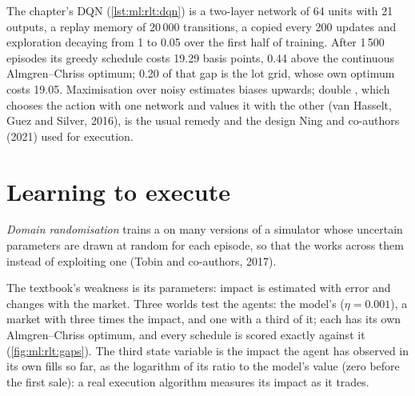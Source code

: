 The chapter's DQN (\cref{lst:ml:rlt:dqn}) is a two-layer network of 64 units with 21 outputs, a replay memory of 20\,000
transitions, a  copied every 200 updates and exploration decaying from 1 to 0.05 over the first half of
training. After 1\,500 episodes its greedy schedule costs 19.29 basis points, 0.44 above the continuous Almgren--Chriss
optimum; 0.20 of that gap is the lot grid, whose own optimum costs 19.05. Maximisation over noisy estimates biases 
upwards; double , which chooses the action with one network and values it with the other (van Hasselt, Guez and
Silver, 2016), is the usual remedy and the design Ning and co-authors (2021) used for execution.

\section{Learning to execute}

\begin{definition}\label{def:ml:reinforcement-learning-for-execution-and-market-making:dr}
\emph{Domain randomisation} trains a  on many versions of a simulator whose uncertain
parameters are drawn at random for each episode, so that the  works across them instead of exploiting one (Tobin and
co-authors, 2017).
\end{definition}

The textbook's weakness is its parameters: impact is estimated with error and changes with the market. Three worlds test the
agents: the model's ($\eta = 0.001$), a market with three times the impact, and one with a third of it; each has its own
Almgren--Chriss optimum, and every schedule is scored exactly against it (\cref{fig:ml:rlt:gaps}). The third state variable
is the impact the agent has observed in its own fills so far, as the logarithm of its ratio to the model's value (zero before
the first sale): a real execution algorithm measures its impact as it trades.

